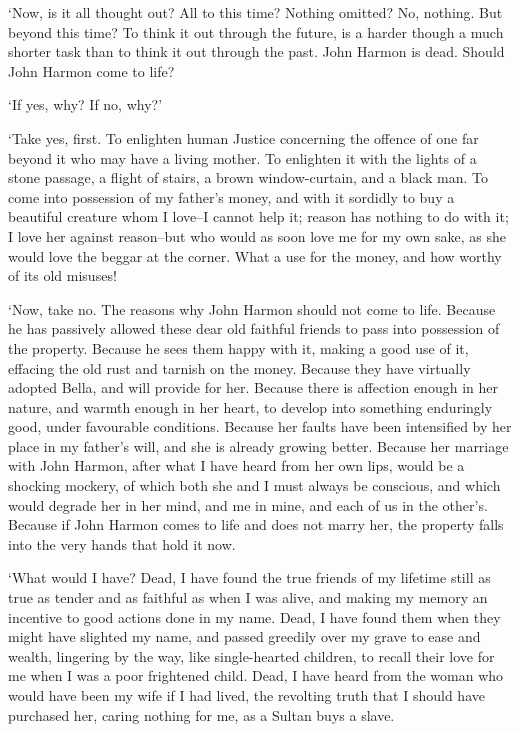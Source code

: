 ‘Now, is it all thought out? All to this time? Nothing omitted? No,
nothing. But beyond this time? To think it out through the future, is a
harder though a much shorter task than to think it out through the past.
John Harmon is dead. Should John Harmon come to life?

‘If yes, why? If no, why?’

‘Take yes, first. To enlighten human Justice concerning the offence of
one far beyond it who may have a living mother. To enlighten it with the
lights of a stone passage, a flight of stairs, a brown window-curtain,
and a black man. To come into possession of my father’s money, and with
it sordidly to buy a beautiful creature whom I love--I cannot help it;
reason has nothing to do with it; I love her against reason--but who
would as soon love me for my own sake, as she would love the beggar at
the corner. What a use for the money, and how worthy of its old misuses!

‘Now, take no. The reasons why John Harmon should not come to life.
Because he has passively allowed these dear old faithful friends to pass
into possession of the property. Because he sees them happy with it,
making a good use of it, effacing the old rust and tarnish on the money.
Because they have virtually adopted Bella, and will provide for her.
Because there is affection enough in her nature, and warmth enough in
her heart, to develop into something enduringly good, under favourable
conditions. Because her faults have been intensified by her place in my
father’s will, and she is already growing better. Because her marriage
with John Harmon, after what I have heard from her own lips, would be a
shocking mockery, of which both she and I must always be conscious, and
which would degrade her in her mind, and me in mine, and each of us in
the other’s. Because if John Harmon comes to life and does not marry
her, the property falls into the very hands that hold it now.

‘What would I have? Dead, I have found the true friends of my lifetime
still as true as tender and as faithful as when I was alive, and making
my memory an incentive to good actions done in my name. Dead, I have
found them when they might have slighted my name, and passed
greedily over my grave to ease and wealth, lingering by the way, like
single-hearted children, to recall their love for me when I was a poor
frightened child. Dead, I have heard from the woman who would have been
my wife if I had lived, the revolting truth that I should have purchased
her, caring nothing for me, as a Sultan buys a slave.

